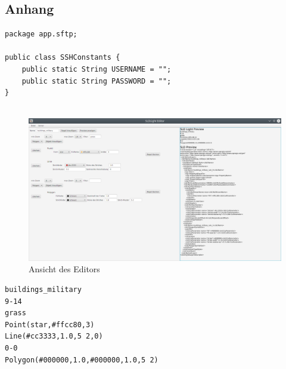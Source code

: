 \subsection*{Anhang}\label{anhang}

\lstset{language=java}
\begin{lstlisting}[frame=htrbl, caption={Die Klasse 'SSHConstants.java'}, label={lst:SSHConstants}]
package app.sftp;

public class SSHConstants {
    public static String USERNAME = "";
    public static String PASSWORD = "";
}


\end{lstlisting}

\begin{figure}[h]
 \centering
 \includegraphics[width=1\textwidth]{abb/editor}
 \caption{Ansicht des Editors}\label{abb:editor}
\end{figure}

\lstset{language=java}
\begin{lstlisting}[frame=htrbl, caption={Beispiel für SLD-Light}, label={lst:SLDLight}]
buildings_military
9-14
grass
Point(star,#ffcc80,3)
Line(#cc3333,1.0,5 2,0)
0-0
Polygon(#000000,1.0,#000000,1.0,5 2)
\end{lstlisting}


